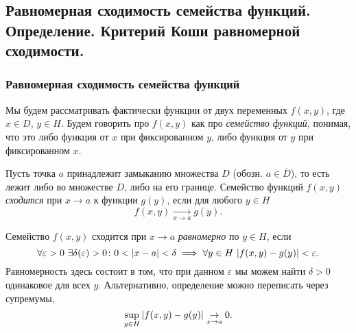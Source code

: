 \subsection{Равномерная сходимость семейства функций. Определение. Критерий Коши равномерной сходимости.}

\subsubsection{Равномерная сходимость семейства функций}

Мы будем рассматривать фактически функции от двух переменных $f(x, y)$, где $x \in D$, $y \in H$.
Будем говорить про $f(x, y)$ как про {\it семейство функций}, понимая, что это либо функция от $x$ при фиксированном $y$, либо функция от $y$ при фиксированном $x$.

\begin{definition}
    Пусть точка $a$ принадлежит замыканию множества $D$ (обозн. $a \in \overline{D}$), то есть лежит либо во множестве $D$, либо на его границе.
    Семейство функций $f(x, y)$ {\it сходится} при $x \to a$ к функции $g(y)$, если для любого $y \in H$
    \[
        f(x, y) \underset{x \to a}{\to} g(y).
    \]
\end{definition}

\begin{definition}
    Семейство $f(x, y)$ сходится при $x \to a$ {\it равномерно} по $y \in H$, если
    \[
         \forall \varepsilon > 0~ \exists \delta(\varepsilon) > 0 \colon 0 < \abs{x - a} < \delta \implies \forall y \in H~ \abs{f(x, y) - g(y)} < \varepsilon.
    \]
    Равномерность здесь состоит в том, что при данном $\varepsilon$ мы можем найти $\delta > 0$ одинаковое для всех $y$.
    Альтернативно, определение можно переписать через супремумы,
    \[
        \sup\limits_{y \in H} \abs{f(x, y) - g(y)} \underset{x \to a}{\to} 0.
    \]
\end{definition}

